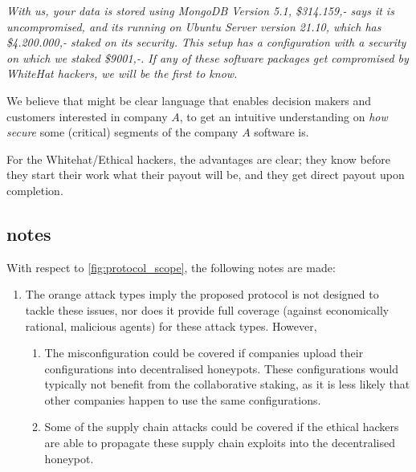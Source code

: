 \textit{With us, your data is stored using MongoDB Version 5.1, \$314.159,- says it is uncompromised, and its running on Ubuntu Server version 21.10, which has \$4.200.000,- staked on its security. This setup has a configuration with a security on which we staked \$9001,-. If any of these software packages get compromised by WhiteHat hackers, we will be the first to know.}

We believe that might be clear language that enables decision makers and customers interested in company $A$, to get an intuitive understanding on \textit{how secure} some (critical) segments of the company $A$ software is.

For the Whitehat/Ethical hackers, the advantages are clear; they know before they start their work what their payout will be, and they get direct payout upon completion.

\subsection{ notes}
With respect to \cref{fig:protocol_scope}, the following notes are made:
\begin{enumerate} 
    \item The orange attack types imply the proposed protocol is not designed to tackle these issues, nor does it provide full coverage (against economically rational, malicious agents) for these attack types. However,
    \begin{enumerate}
        \item The misconfiguration could be covered if companies upload their configurations into decentralised honeypots. These configurations would typically not benefit from the collaborative staking, as it is less likely that other companies happen to use the same configurations.
        \item Some of the supply chain attacks could be covered if the ethical hackers are able to propagate these supply chain exploits into the decentralised honeypot.
    \end{enumerate}
\end{enumerate}

